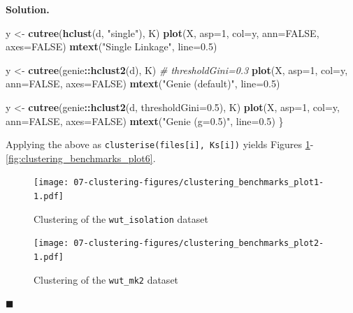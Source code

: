 \documentclass[10pt,b5paper,krantz1]{krantz}
\newenvironment{Shaded}{\begin{snugshade}}{\end{snugshade}}
\newcommand{\CommentTok}[1]{\textcolor[rgb]{0.37,0.37,0.37}{\textit{#1}}}
\newcommand{\DataTypeTok}[1]{\textcolor[rgb]{0.27,0.27,0.27}{#1}}
\newcommand{\DecValTok}[1]{\textcolor[rgb]{0.06,0.06,0.06}{#1}}
\newcommand{\FloatTok}[1]{\textcolor[rgb]{0.06,0.06,0.06}{#1}}
\newcommand{\KeywordTok}[1]{\textcolor[rgb]{0.27,0.27,0.27}{\textbf{#1}}}
\newcommand{\NormalTok}[1]{#1}
\newcommand{\OperatorTok}[1]{\textcolor[rgb]{0.43,0.43,0.43}{\textbf{#1}}}
\newcommand{\OtherTok}[1]{\textcolor[rgb]{0.37,0.37,0.37}{#1}}
\newcommand{\StringTok}[1]{\textcolor[rgb]{0.5,0.5,0.5}{#1}}
\newenvironment{solution}{%
\bigskip\noindent\textbf{Solution. }%
\it\ignorespaces%
\ignorespaces%
}{\ignorespaces%
\hfill$\blacksquare$%
}
\begin{document}
\begin{solution}
\begin{Shaded}
\begin{Highlighting}[]
\NormalTok{    y <-}\StringTok{ }\KeywordTok{cutree}\NormalTok{(}\KeywordTok{hclust}\NormalTok{(d, }\StringTok{"single"}\NormalTok{), K)}
    \KeywordTok{plot}\NormalTok{(X, }\DataTypeTok{asp=}\DecValTok{1}\NormalTok{, }\DataTypeTok{col=}\NormalTok{y, }\DataTypeTok{ann=}\OtherTok{FALSE}\NormalTok{, }\DataTypeTok{axes=}\OtherTok{FALSE}\NormalTok{)}
    \KeywordTok{mtext}\NormalTok{(}\StringTok{"Single Linkage"}\NormalTok{, }\DataTypeTok{line=}\FloatTok{0.5}\NormalTok{)}

\NormalTok{    y <-}\StringTok{ }\KeywordTok{cutree}\NormalTok{(genie}\OperatorTok{::}\KeywordTok{hclust2}\NormalTok{(d), K) }\CommentTok{# thresholdGini=0.3}
    \KeywordTok{plot}\NormalTok{(X, }\DataTypeTok{asp=}\DecValTok{1}\NormalTok{, }\DataTypeTok{col=}\NormalTok{y, }\DataTypeTok{ann=}\OtherTok{FALSE}\NormalTok{, }\DataTypeTok{axes=}\OtherTok{FALSE}\NormalTok{)}
    \KeywordTok{mtext}\NormalTok{(}\StringTok{"Genie (default)"}\NormalTok{, }\DataTypeTok{line=}\FloatTok{0.5}\NormalTok{)}

\NormalTok{    y <-}\StringTok{ }\KeywordTok{cutree}\NormalTok{(genie}\OperatorTok{::}\KeywordTok{hclust2}\NormalTok{(d, }\DataTypeTok{thresholdGini=}\FloatTok{0.5}\NormalTok{), K)}
    \KeywordTok{plot}\NormalTok{(X, }\DataTypeTok{asp=}\DecValTok{1}\NormalTok{, }\DataTypeTok{col=}\NormalTok{y, }\DataTypeTok{ann=}\OtherTok{FALSE}\NormalTok{, }\DataTypeTok{axes=}\OtherTok{FALSE}\NormalTok{)}
    \KeywordTok{mtext}\NormalTok{(}\StringTok{"Genie (g=0.5)"}\NormalTok{, }\DataTypeTok{line=}\FloatTok{0.5}\NormalTok{)}
\NormalTok{\}}
\end{Highlighting}
\end{Shaded}

Applying the above as \texttt{clusterise(files{[}i{]},\ Ks{[}i{]})} yields
Figures \ref{fig:clustering_benchmarks_plot1}-\ref{fig:clustering_benchmarks_plot6}.

\begin{figure}
\hypertarget{fig:clustering_benchmarks_plot1}{%
\centering
\texttt{[image: 07-clustering-figures/clustering\_benchmarks\_plot1-1.pdf]}
\caption{Clustering of the \texttt{wut\_isolation} dataset}\label{fig:clustering_benchmarks_plot1}
}
\end{figure}

\begin{figure}
\hypertarget{fig:clustering_benchmarks_plot2}{%
\centering
\texttt{[image: 07-clustering-figures/clustering\_benchmarks\_plot2-1.pdf]}
\caption{Clustering of the \texttt{wut\_mk2} dataset}\label{fig:clustering_benchmarks_plot2}
}
\end{figure}


\end{solution}
\end{document}
